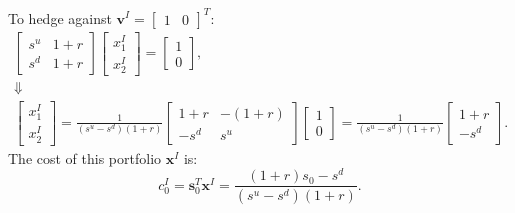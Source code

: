 \documentclass[final,3p,times]{elsarticle}
\begin{document}
	To hedge against $\mathbf{v}^{I}=\begin{bmatrix} 1 & 0\end{bmatrix}^T$:
	\begin{gather}
		\begin{bmatrix} s^u & 1+r \\ s^d & 1+r \end{bmatrix}
		\begin{bmatrix} x^{I}_1 \\ x^{I}_2 \end{bmatrix}
		=
		\begin{bmatrix} 1 \\ 0 \end{bmatrix},\nonumber\\
		\Downarrow\nonumber\\
		\begin{bmatrix} x^{I}_1 \\ x^{I}_2 \end{bmatrix}
		=
		\frac{1}{\left(s^u-s^d\right)\left(1+r\right)}
		\begin{bmatrix} 1+r & -\left(1+r\right) \\ -s^d & s^u \end{bmatrix}
		\begin{bmatrix} 1 \\ 0 \end{bmatrix}
		=
		\frac{1}{\left(s^u-s^d\right)\left(1+r\right)}
		\begin{bmatrix} 1+r \\ -s^d \end{bmatrix}
		.
	\end{gather}
	The cost of this portfolio $\mathbf{x}^{I}$ is:
	\begin{equation}
		c_0^{I}=\mathbf{s}_0^T\mathbf{x}^{I}=\frac{\left(1+r\right)s_0 - s^d}{\left(s^u-s^d\right)\left(1+r\right)}
		.
	\end{equation}
	
\end{document}
